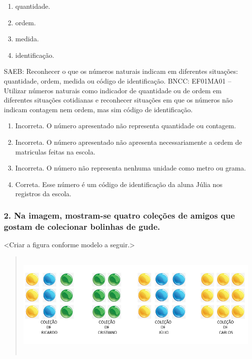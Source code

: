 \begin{enumerate}
\def\labelenumi{\Alph{enumi})}
\item
  quantidade.
\item
  ordem.
\item
  medida.
\item
  identificação.
\end{enumerate}

SAEB: Reconhecer o que os números naturais indicam em diferentes
situações: quantidade, ordem, medida ou código de identificação.
BNCC: EF01MA01 -- Utilizar números naturais como indicador de quantidade
ou de ordem em diferentes situações cotidianas e reconhecer situações em
que os números não indicam contagem nem ordem, mas sim código de
identificação.

\begin{enumerate}
\def\labelenumi{\alph{enumi})}
\item
  Incorreta. O número apresentado não representa quantidade ou contagem.
\item
  Incorreta. O número apresentado não apresenta necessariamente a ordem
  de matriculas feitas na escola.
\item
  Incorreta. O número não representa nenhuma unidade como metro ou
  grama.
\item
  Correta. Esse número é um código de identificação da aluna Júlia nos
  registros da escola.
\end{enumerate}

\subsubsection{2. Na imagem, mostram-se quatro coleções de amigos que gostam de colecionar
bolinhas de gude.}\label{section-5}

\textless{}Criar a figura conforme modelo a seguir.\textgreater{}

\begin{quote}
\includegraphics[width=5.90556in,height=2.07014in]{media/image12.png}
\end{quote}

